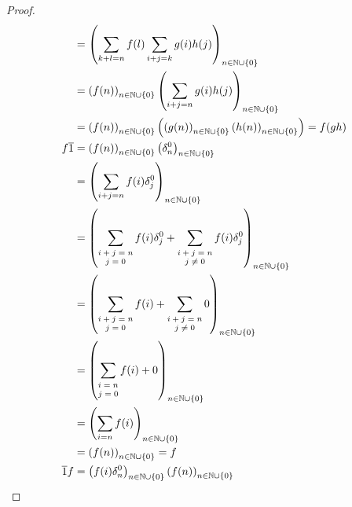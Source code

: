 \documentclass[dvipdfmx]{jsarticle}
\begin{document}
\begin{proof}
\begin{align*}
&= \left( \sum_{k\text{+}l = n} {f(l)\sum_{i + j = k} {g(i)h(j)}} \right)_{n \in \mathbb{N} \cup \left\{ 0 \right\}}\\
&= \left( f(n) \right)_{n \in \mathbb{N} \cup \left\{ 0 \right\}}\left( \sum_{i + j = n} {g(i)h(j)} \right)_{n \in \mathbb{N} \cup \left\{ 0 \right\}}\\
&= \left( f(n) \right)_{n \in \mathbb{N} \cup \left\{ 0 \right\}}\left( \left( g(n) \right)_{n \in \mathbb{N} \cup \left\{ 0 \right\}}\left( h(n) \right)_{n \in \mathbb{N} \cup \left\{ 0 \right\}} \right) = f(gh)\\
f\overline{1} &= \left( f(n) \right)_{n \in \mathbb{N} \cup \left\{ 0 \right\}}\left( \delta_{n}^{0} \right)_{n \in \mathbb{N} \cup \left\{ 0 \right\}}\\
&= \left( \sum_{i + j = n}  f(i)\delta_{j}^{0} \right)_{n \in \mathbb{N} \cup \left\{ 0 \right\}}\\
&= \left( \sum_{\scriptsize \begin{matrix} i + j = n \\ j = 0 \end{matrix}} {f(i)\delta_{j}^{0}} + \sum_{\scriptsize \begin{matrix} i + j = n \\j \neq 0 \end{matrix}} f(i)\delta_{j}^{0} \right)_{n \in \mathbb{N} \cup \left\{ 0 \right\}}\\
&= \left( \sum_{\scriptsize \begin{matrix} i + j = n \\ j = 0 \end{matrix}} {f(i)} + \sum_{\scriptsize \begin{matrix} i + j = n \\j \neq 0 \end{matrix}} 0 \right)_{n \in \mathbb{N} \cup \left\{ 0 \right\}}\\
&= \left( \sum_{\scriptsize \begin{matrix} i = n \\j = 0 \end{matrix}} {f(i)} + 0 \right)_{n \in \mathbb{N} \cup \left\{ 0 \right\}}\\
&= \left( \sum_{i = n } {f(i)} \right)_{n \in \mathbb{N} \cup \left\{ 0 \right\}}\\
&= \left( f(n) \right)_{n \in \mathbb{N} \cup \left\{ 0 \right\}} = f\\
\overline{1}f &= \left( f(i)\delta_{n}^{0} \right)_{n \in \mathbb{N} \cup \left\{ 0 \right\}}\left( f(n) \right)_{n \in \mathbb{N} \cup \left\{ 0 \right\}}\\

\end{align*}
\end{proof}
\end{document}
